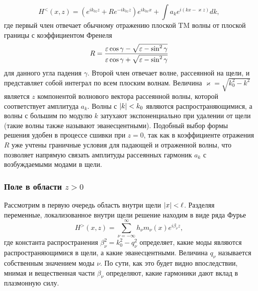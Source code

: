 \begin{equation}
  H^<(x,z) = (e^{i k_{0z} z} + R e^{-i k_{0z} z}) e^{i k_{0x} x} + \int a_k e^{i (k x - \varkappa z)} dk, 
\end{equation}
где первый член отвечает обычному отражению плоской TM волны от плоской границы с коэффициентом Френеля 
\[
 R = \frac{\varepsilon \cos{\gamma} - \sqrt{\varepsilon - \sin^2{\gamma}}}{\varepsilon \cos{\gamma} + \sqrt{\varepsilon - \sin^2{\gamma}}}
\]
для данного угла падения $\gamma$.  
Второй член отвечает волне, рассеянной на щели, и представляет собой интеграл по всем плоским волнам. Величина $\varkappa = \sqrt{k_0^2-k^2}$ является
$z$ компонентой волнового вектора рассеянной волны, которой соответствует амплитуда $a_k$. Волны с $\lvert k\rvert < k_0$ являются распространяющимися,
а волны с большим по модулю $k$ затухают экспоненциально при удалении от щели (такие волны также называют эванесцентными). Подобный выбор формы решения удобен в процессе сшивки при $z = 0$, так как в коэффициенте отражения $R$ уже учтены граничные условия для падающей и отраженной волны, что позволяет напрямую связать амплитуды рассеянных гармоник $a_k$ с возбуждаемыми модами в щели. 

\subsubsection{Поле в области $z>0$}
Рассмотрим в первую очередь область внутри щели $\lvert x\rvert<\ell$. Разделяя переменные, локализованное внутри щели решение 
находим в виде ряда Фурье 
\begin{equation}
H^>(x,z) = \sum_{\nu = -\infty}^{\infty} h_\nu m_\nu(x) e^{i \beta_{\nu} z},
  \label{eq:Fourier_series}
\end{equation}
где константа распространения $\beta_\nu^2 =  k_0^2-q_\nu^2 $ определяет, какие моды являются распространяющимися в щели, а какие эванесцентными. Величина $q_\nu$ называется собственным значением моды $\nu$. 
По сути, как это будет видно впоследствии, мнимая и вещественная части $\beta_\nu$ определяют, какие гармоники дают вклад в плазмонную силу. 

